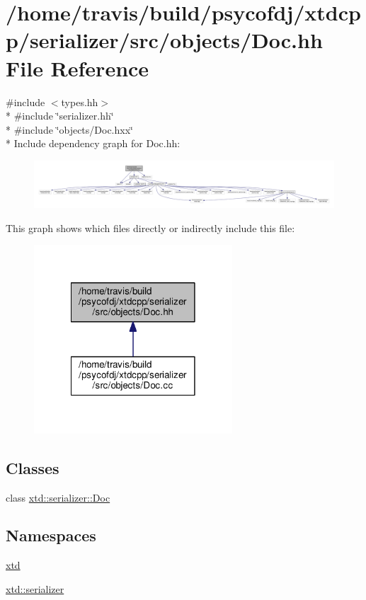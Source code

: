 \hypertarget{Doc_8hh}{\section{/home/travis/build/psycofdj/xtdcpp/serializer/src/objects/\-Doc.hh File Reference}
\label{Doc_8hh}
}
{\ttfamily \#include $<$types.\-hh$>$}\\*
{\ttfamily \#include \char`\"{}serializer.\-hh\char`\"{}}\\*
{\ttfamily \#include \char`\"{}objects/\-Doc.\-hxx\char`\"{}}\\*
Include dependency graph for Doc.\-hh\-:
\nopagebreak
\begin{figure}[H]
\begin{center}
\leavevmode
\includegraphics[width=350pt]{Doc_8hh__incl}
\end{center}
\end{figure}
This graph shows which files directly or indirectly include this file\-:
\nopagebreak
\begin{figure}[H]
\begin{center}
\leavevmode
\includegraphics[width=210pt]{Doc_8hh__dep__incl}
\end{center}
\end{figure}
\subsection*{Classes}
\begin{DoxyCompactItemize}
\item 
class \hyperlink{classxtd_1_1serializer_1_1Doc}{xtd\-::serializer\-::\-Doc}
\end{DoxyCompactItemize}
\subsection*{Namespaces}
\begin{DoxyCompactItemize}
\item 
\hyperlink{namespacextd}{xtd}
\item 
\hyperlink{namespacextd_1_1serializer}{xtd\-::serializer}
\end{DoxyCompactItemize}
